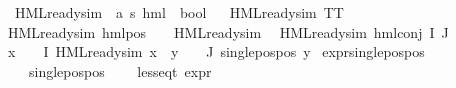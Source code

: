 \begin{isabellebody}
\isamarkupfalse%
\ HML{\isacharunderscore}{\kern0pt}ready{\isacharunderscore}{\kern0pt}sim\ {\isacharcolon}{\kern0pt}{\isacharcolon}{\kern0pt}\ {\isachardoublequoteopen}{\isacharparenleft}{\kern0pt}{\isacharprime}{\kern0pt}a{\isacharcomma}{\kern0pt}\ {\isacharprime}{\kern0pt}s{\isacharparenright}{\kern0pt}\ hml\ {\isasymRightarrow}\ bool{\isachardoublequoteclose}\isanewline
\ \ \isanewline
{\isachardoublequoteopen}HML{\isacharunderscore}{\kern0pt}ready{\isacharunderscore}{\kern0pt}sim\ TT{\isachardoublequoteclose}\ {\isacharbar}{\kern0pt}\isanewline
{\isachardoublequoteopen}HML{\isacharunderscore}{\kern0pt}ready{\isacharunderscore}{\kern0pt}sim\ {\isacharparenleft}{\kern0pt}hml{\isacharunderscore}{\kern0pt}pos\ {\isasymalpha}\ {\isasymphi}{\isacharparenright}{\kern0pt}{\isachardoublequoteclose}\ \ {\isachardoublequoteopen}HML{\isacharunderscore}{\kern0pt}ready{\isacharunderscore}{\kern0pt}sim\ {\isasymphi}{\isachardoublequoteclose}\ {\isacharbar}{\kern0pt}\isanewline
{\isachardoublequoteopen}HML{\isacharunderscore}{\kern0pt}ready{\isacharunderscore}{\kern0pt}sim\ {\isacharparenleft}{\kern0pt}hml{\isacharunderscore}{\kern0pt}conj\ I\ J\ {\isasymPhi}{\isacharparenright}{\kern0pt}{\isachardoublequoteclose}\ \ \isanewline
{\isachardoublequoteopen}{\isacharparenleft}{\kern0pt}{\isasymforall}x\ {\isasymin}\ {\isacharparenleft}{\kern0pt}{\isasymPhi}\ {\isacharbackquote}{\kern0pt}\ I{\isacharparenright}{\kern0pt}{\isachardot}{\kern0pt}\ HML{\isacharunderscore}{\kern0pt}ready{\isacharunderscore}{\kern0pt}sim\ x{\isacharparenright}{\kern0pt}\ {\isasymand}\ {\isacharparenleft}{\kern0pt}{\isasymforall}y\ {\isasymin}\ {\isacharparenleft}{\kern0pt}{\isasymPhi}\ {\isacharbackquote}{\kern0pt}\ J{\isacharparenright}{\kern0pt}{\isachardot}{\kern0pt}\ single{\isacharunderscore}{\kern0pt}pos{\isacharunderscore}{\kern0pt}pos\ y{\isacharparenright}{\kern0pt}{\isachardoublequoteclose}\isanewline
\isanewline
{}\isamarkupfalse%
\ expr{\isacharunderscore}{\kern0pt}single{\isacharunderscore}{\kern0pt}pos{\isacharunderscore}{\kern0pt}pos{\isacharcolon}{\kern0pt}\isanewline
\ \ \ {\isachardoublequoteopen}single{\isacharunderscore}{\kern0pt}pos{\isacharunderscore}{\kern0pt}pos\ {\isasymphi}{\isachardoublequoteclose}\isanewline
\ \ \ {\isachardoublequoteopen}less{\isacharunderscore}{\kern0pt}eq{\isacharunderscore}{\kern0pt}t\ {\isacharparenleft}{\kern0pt}expr\ {\isasymphi}{\isacharparenright}{\kern0pt}\ {\isacharparenleft}{\kern0pt}{}{\isacharcomma}{\kern0pt}\ {\isasyminfinity}{\isacharcomma}{\kern0pt}\ {}{\isacharcomma}{\kern0pt}\ {}{\isacharcomma}{\kern0pt}\ {}{\isacharcomma}{\kern0pt}\ {}{\isacharparenright}{\kern0pt}{\isachardoublequoteclose}\isanewline

\end{isabellebody}
